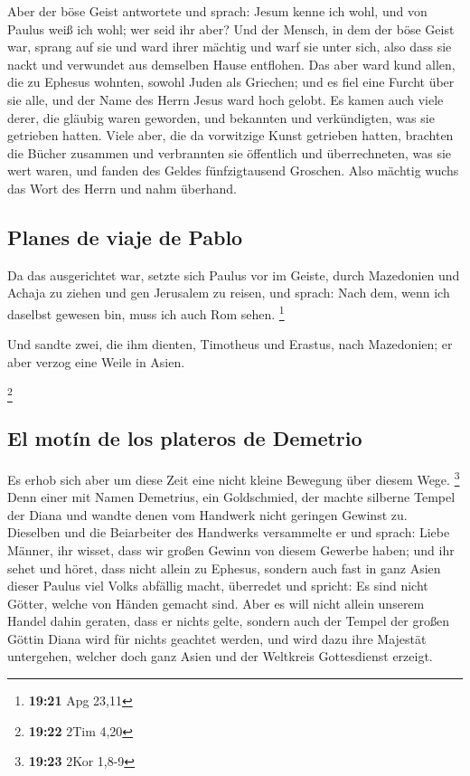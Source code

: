  Aber der böse Geist antwortete und sprach: Jesum kenne
ich wohl, und von Paulus weiß ich wohl; wer seid ihr aber?
 Und der Mensch, in dem der böse Geist war, sprang auf
sie und ward ihrer mächtig und warf sie unter sich, also dass sie nackt
und verwundet aus demselben Hause entflohen.  Das aber
ward kund allen, die zu Ephesus wohnten, sowohl Juden als Griechen; und
es fiel eine Furcht über sie alle, und der Name des Herrn Jesus ward
hoch gelobt.  Es kamen auch viele derer, die gläubig
waren geworden, und bekannten und verkündigten, was sie getrieben
hatten.  Viele aber, die da vorwitzige Kunst getrieben
hatten, brachten die Bücher zusammen und verbrannten sie öffentlich und
überrechneten, was sie wert waren, und fanden des Geldes fünfzigtausend
Groschen.  Also mächtig wuchs das Wort des Herrn und nahm
überhand.

\hypertarget{planes-de-viaje-de-pablo}{%
\subsection{Planes de viaje de Pablo}\label{planes-de-viaje-de-pablo}}

 Da das ausgerichtet war, setzte sich Paulus vor im
Geiste, durch Mazedonien und Achaja zu ziehen und gen Jerusalem zu
reisen, und sprach: Nach dem, wenn ich daselbst gewesen bin, muss ich
auch Rom sehen. \footnote{\textbf{19:21} Apg 23,11}

 Und sandte zwei, die ihm dienten, Timotheus und Erastus,
nach Mazedonien; er aber verzog eine Weile in Asien.

\footnote{\textbf{19:22} 2Tim 4,20}

\hypertarget{el-motuxedn-de-los-plateros-de-demetrio}{%
\subsection{El motín de los plateros de
Demetrio}\label{el-motuxedn-de-los-plateros-de-demetrio}}

 Es erhob sich aber um diese Zeit eine nicht kleine
Bewegung über diesem Wege. \footnote{\textbf{19:23} 2Kor 1,8-9}
 Denn einer mit Namen Demetrius, ein Goldschmied, der
machte silberne Tempel der Diana und wandte denen vom Handwerk nicht
geringen Gewinst zu.  Dieselben und die Beiarbeiter des
Handwerks versammelte er und sprach: Liebe Männer, ihr wisset, dass wir
großen Gewinn von diesem Gewerbe haben;  und ihr sehet
und höret, dass nicht allein zu Ephesus, sondern auch fast in ganz Asien
dieser Paulus viel Volks abfällig macht, überredet und spricht: Es sind
nicht Götter, welche von Händen gemacht sind.  Aber es
will nicht allein unserem Handel dahin geraten, dass er nichts gelte,
sondern auch der Tempel der großen Göttin Diana wird für nichts geachtet
werden, und wird dazu ihre Majestät untergehen, welcher doch ganz Asien
und der Weltkreis Gottesdienst erzeigt.

